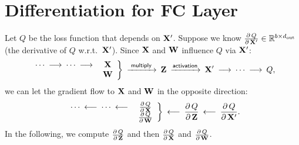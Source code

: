 \documentclass[11pt]{article}
\numberwithin{equation}{section}
\def\W{{\bf W}}
\def\X{{\bf X}}
\def\Z{{\bf Z}}
\def\RB{{\mathbb R}}
\def\dout{{d_{\textrm{out}}}}
\begin{document}
\section{Differentiation for FC Layer} \label{sec:differential}

Let $Q$ be the loss function that depends on $\X'$.
Suppose we know $\frac{\partial \, Q}{ \partial \, \X'} \in \RB^{b\times \dout}$ (the derivative of $Q$ w.r.t.\ $\X'$).
Since $\X$ and $\W$ influence $Q$ via $\X'$:
\begin{equation*}
    \left.
    \begin{array}{c c}
         \cdots \: \longrightarrow \: \cdots \: \longrightarrow \: & \X   \\
         & \W
    \end{array}
    \right\}
    \: \xrightarrow{\textsf{~multiply~}}  \: 
    \Z 
    \: \xrightarrow{\textsf{activation}}  \: 
    \X'
    \: \longrightarrow \: 
    \cdots
    \: \longrightarrow \: 
    Q ,
\end{equation*}
we can let the gradient flow to $\X$ and $\W$ in the opposite direction:
\begin{equation*}
    \left.
    \begin{array}{c c}
         \cdots \: \longleftarrow \: \cdots \: \longleftarrow \: & \frac{\partial \, Q }{\partial \, \X}    \\
         & \frac{\partial \, Q }{\partial \, \W} 
    \end{array}
    \right\}
    \: \longleftarrow \: 
    \frac{\partial \, Q }{\partial \, \Z} 
    \: \longleftarrow \: 
    \frac{\partial \, Q }{\partial \, \X'} .
\end{equation*}
In the following, we compute $\frac{\partial \, Q}{ \partial \, \Z}$ and then $\frac{\partial \, Q}{ \partial \, \X}$ and $\frac{\partial \, Q}{ \partial \, \W}$. 
\end{document}
